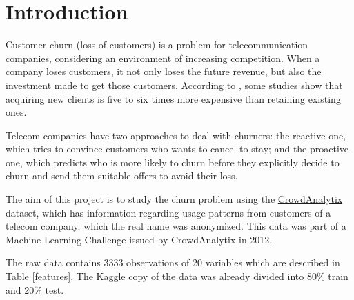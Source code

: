 \documentclass[12pt,letterpaper]{article}
\begin{document}
	\tableofcontents
	\newpage
	\section{Introduction}
	
	Customer churn (loss of customers) is a problem for telecommunication companies, considering an environment of increasing competition. When a company loses customers, it not only loses the future revenue, but also the investment made to get those customers. According to \cite{class_imbalance}, some studies show that acquiring new clients is five to six times more expensive than retaining existing ones. 
	
	Telecom companies have two approaches to deal with churners: the reactive one, which tries to convince customers who wants to cancel to stay; and the proactive one, which predicts who is more likely to churn before they explicitly decide to churn and send them suitable offers to avoid their loss.
	
	The aim of this project is to study the churn problem using the \href{https://www.crowdanalytix.com/contests/why-customer-churn/}{CrowdAnalytix} dataset, which has information regarding usage patterns from customers of a telecom company, which the real name was anonymized. This data was part of a Machine Learning Challenge issued by CrowdAnalytix in 2012.
	
	The raw data contains 3333 observations of 20 variables which are described in Table \ref{features}. The \href{https://www.kaggle.com/mnassrib/telecom-churn-datasets}{Kaggle} copy of the data was already divided into 80\% train and 20\% test.
	
\end{document}
